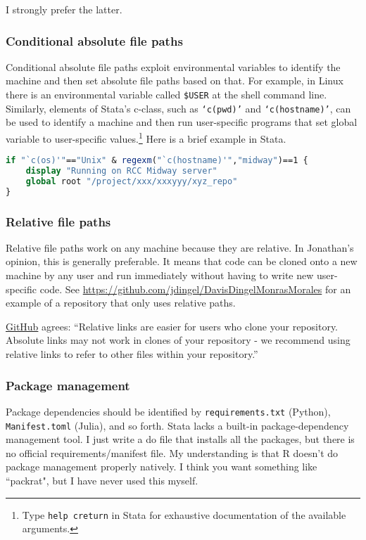 I strongly prefer the latter.

\subsubsection{Conditional absolute file paths}

Conditional absolute file paths exploit environmental variables to identify the machine and then set absolute file paths based on that.
For example, in Linux there is an environmental variable called \texttt{\$USER} at the shell command line.
Similarly, elements of Stata's c-class, such as \texttt{`c(pwd)'} and \texttt{`c(hostname)'}, can be used to identify a machine 
and then run user-specific programs that set global variable to user-specific values.\footnote{
	Type \texttt{help creturn} in Stata for exhaustive documentation of the available arguments.
}
Here is a brief example in Stata.
\begin{lstlisting}[language=stata]
if "`c(os)'"=="Unix" & regexm("`c(hostname)'","midway")==1 {
	display "Running on RCC Midway server"
	global root "/project/xxx/xxxyyy/xyz_repo"
}
\end{lstlisting}

\subsubsection{Relative file paths}

Relative file paths work on any machine because they are relative.
In Jonathan's opinion, this is generally preferable.
It means that code can be cloned onto a new machine by any user and run immediately without having to write new user-specific code.
See \url{https://github.com/jdingel/DavisDingelMonrasMorales} for an example of a repository that only uses relative paths.

\href{https://help.github.com/articles/about-readmes/\#relative-links-and-image-paths-in-readme-files}{GitHub} agrees:
``Relative links are easier for users who clone your repository. Absolute links may not work in clones of your repository - we recommend using relative links to refer to other files within your repository.''

\subsubsection{Package management}

Package dependencies should be identified by \texttt{requirements.txt} (Python), \texttt{Manifest.toml} (Julia), and so forth.
Stata lacks a built-in package-dependency management tool.
I just write a do file that installs all the packages, but there is no official requirements/manifest file.
My understanding is that R doesn't do package management properly natively.
I think you want something like ``packrat", but I have never used this myself.

